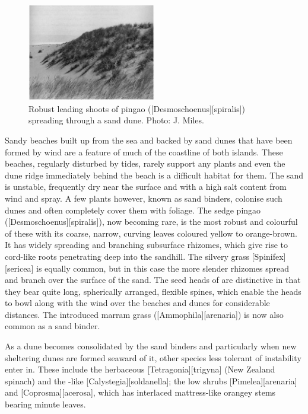 \begin{figure}
	\includegraphics[width=0.5\textwidth]{graphics/figure88pingao.jpg}
	\centering
	\caption[Robust leading shoots of pingao]{Robust leading shoots of pingao ([Desmoschoenus][spiralis]) spreading through a sand dune.
	Photo: J. Miles.}%
	\label{fig:88pingao}
\end{figure}

Sandy beaches built up from the sea and backed by sand dunes that have been formed by wind are a feature of much of the coastline of both islands.
These beaches, regularly disturbed by tides, rarely support any plants and even the dune ridge immediately behind the beach is a difficult habitat for them.
The sand is unstable, frequently dry near the surface and with a high salt content from wind and spray.
A few plants however, known as sand binders, colonise such dunes and often completely cover them with foliage.
The sedge pingao ([Desmoschoenus][spiralis]), now becoming rare, is the most robust and colourful of these with its coarse, narrow, curving leaves coloured yellow to orange-brown.
It has widely spreading and branching subsurface rhizomes, which give rise to cord-like roots penetrating deep into the sandhill.
The silvery grass [Spinifex][sericea] is equally common, but in this case the more slender rhizomes spread and branch over the surface of the sand.
The seed heads of  are distinctive in that they bear quite long, spherically arranged, flexible spines, which enable the heads to bowl along with the wind over the beaches and dunes for considerable distances.
The introduced marram grass ([Ammophila][arenaria]) is now also common as a sand binder.

As a dune becomes consolidated by the sand binders and particularly when new sheltering dunes are formed seaward of it, other species less tolerant of instability enter in.
These include the herbaceous [Tetragonia][trigyna] (New Zealand spinach) and the -like [Calystegia][soldanella]; the low shrubs [Pimelea][arenaria] and [Coprosma][acerosa], which has interlaced mattress-like orangey stems bearing minute leaves.

